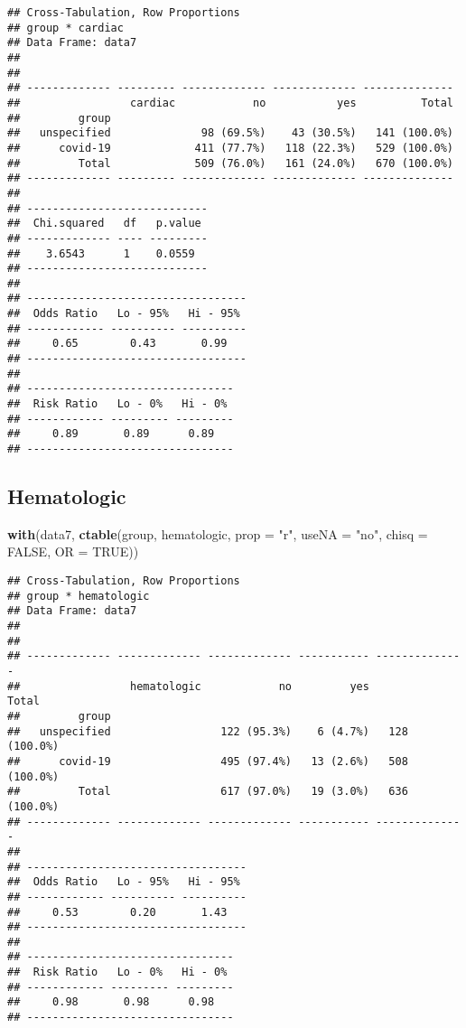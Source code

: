 \documentclass[
]{article}
\newenvironment{Shaded}{\begin{snugshade}}{\end{snugshade}}
\newcommand{\DataTypeTok}[1]{\textcolor[rgb]{0.13,0.29,0.53}{#1}}
\newcommand{\KeywordTok}[1]{\textcolor[rgb]{0.13,0.29,0.53}{\textbf{#1}}}
\newcommand{\NormalTok}[1]{#1}
\newcommand{\OtherTok}[1]{\textcolor[rgb]{0.56,0.35,0.01}{#1}}
\newcommand{\StringTok}[1]{\textcolor[rgb]{0.31,0.60,0.02}{#1}}
\begin{document}
\begin{verbatim}
## Cross-Tabulation, Row Proportions  
## group * cardiac  
## Data Frame: data7  
## 
## 
## ------------- --------- ------------- ------------- --------------
##                 cardiac            no           yes          Total
##         group                                                     
##   unspecified              98 (69.5%)    43 (30.5%)   141 (100.0%)
##      covid-19             411 (77.7%)   118 (22.3%)   529 (100.0%)
##         Total             509 (76.0%)   161 (24.0%)   670 (100.0%)
## ------------- --------- ------------- ------------- --------------
## 
## ----------------------------
##  Chi.squared   df   p.value 
## ------------- ---- ---------
##    3.6543      1    0.0559  
## ----------------------------
## 
## ----------------------------------
##  Odds Ratio   Lo - 95%   Hi - 95% 
## ------------ ---------- ----------
##     0.65        0.43       0.99   
## ----------------------------------
## 
## --------------------------------
##  Risk Ratio   Lo - 0%   Hi - 0% 
## ------------ --------- ---------
##     0.89       0.89      0.89   
## --------------------------------
\end{verbatim}

\hypertarget{hematologic}{%
\subsection{Hematologic}\label{hematologic}}

\begin{Shaded}
\begin{Highlighting}[]
\KeywordTok{with}\NormalTok{(data7, }\KeywordTok{ctable}\NormalTok{(group, hematologic, }\DataTypeTok{prop =} \StringTok{"r"}\NormalTok{, }\DataTypeTok{useNA =} \StringTok{"no"}\NormalTok{, }\DataTypeTok{chisq =} \OtherTok{FALSE}\NormalTok{, }\DataTypeTok{OR =} \OtherTok{TRUE}\NormalTok{))}
\end{Highlighting}
\end{Shaded}

\begin{verbatim}
## Cross-Tabulation, Row Proportions  
## group * hematologic  
## Data Frame: data7  
## 
## 
## ------------- ------------- ------------- ----------- --------------
##                 hematologic            no         yes          Total
##         group                                                       
##   unspecified                 122 (95.3%)    6 (4.7%)   128 (100.0%)
##      covid-19                 495 (97.4%)   13 (2.6%)   508 (100.0%)
##         Total                 617 (97.0%)   19 (3.0%)   636 (100.0%)
## ------------- ------------- ------------- ----------- --------------
## 
## ----------------------------------
##  Odds Ratio   Lo - 95%   Hi - 95% 
## ------------ ---------- ----------
##     0.53        0.20       1.43   
## ----------------------------------
## 
## --------------------------------
##  Risk Ratio   Lo - 0%   Hi - 0% 
## ------------ --------- ---------
##     0.98       0.98      0.98   
## --------------------------------
\end{verbatim}
\end{document}
